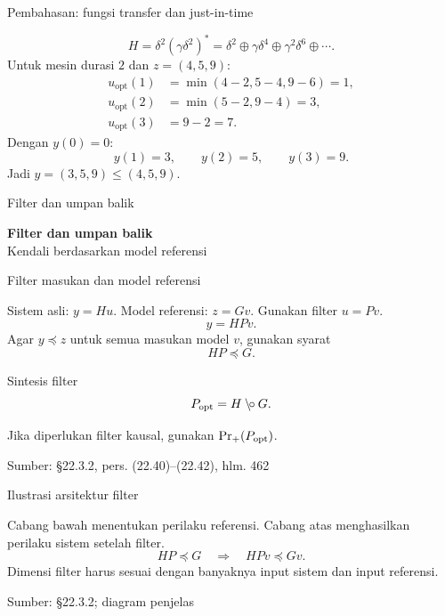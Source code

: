 \documentclass[aspectratio=169,11pt]{beamer}
\newcommand{\source}[1]{%
    \vfill
    \hfill{\tiny\color{gray}Sumber: #1}
}
\newcommand{\res}{\mathbin{\backslash\!\circ}}
\begin{document}
\begin{frame}{Pembahasan: fungsi transfer dan just-in-time}


\[
H=\delta^2(\gamma\delta^2)^*
=\delta^2\oplus\gamma\delta^4\oplus\gamma^2\delta^6\oplus\cdots.
\]
Untuk mesin durasi $2$ dan $z=(4,5,9)$:
\begin{align*}
u_{\mathrm{opt}}(1)&=\min(4-2,5-4,9-6)=1,\\
u_{\mathrm{opt}}(2)&=\min(5-2,9-4)=3,\\
u_{\mathrm{opt}}(3)&=9-2=7.
\end{align*}
Dengan $y(0)=0$:
\[
y(1)=3,\qquad y(2)=5,\qquad y(3)=9.
\]
Jadi $y=(3,5,9)\le(4,5,9)$.


\end{frame}
\begin{frame}{Filter dan umpan balik}
\begin{center}{\LARGE\bfseries\color{AcademicBlue}Filter dan umpan balik}\\[8mm]Kendali berdasarkan model referensi\end{center}
\end{frame}
\begin{frame}{Filter masukan dan model referensi}

Sistem asli: $y=Hu$.
Model referensi: $z=Gv$.
Gunakan filter $u=Pv$.
\[
y=HPv.
\]
Agar $y\preceq z$ untuk semua masukan model $v$, gunakan syarat
\[
HP\preceq G.
\]
\begin{block}{Sintesis filter}
\[
P_{\rm opt}=H\res G.
\]
\end{block}
Jika diperlukan filter kausal, gunakan $\operatorname{Pr}_+(P_{\rm opt})$.

\source{\S22.3.2, pers. (22.40)--(22.42), hlm. 462}
\end{frame}
\begin{frame}{Ilustrasi arsitektur filter}

\begin{center}\end{center}
Cabang bawah menentukan perilaku referensi.
Cabang atas menghasilkan perilaku sistem setelah filter.
\[
HP\preceq G\quad\Longrightarrow\quad HPv\preceq Gv.
\]
Dimensi filter harus sesuai dengan banyaknya input sistem dan input referensi.

\source{\S22.3.2; diagram penjelas}
\end{frame}
\end{document}
